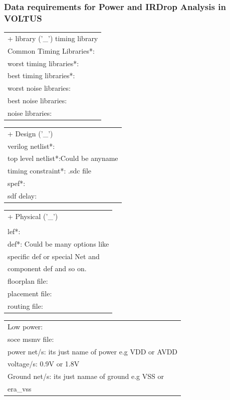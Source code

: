\documentclass[a4paper]{article}
\begin{document}
\subsubsection{Data requirements for Power and IRDrop Analysis in VOLTUS}
\label{sec:org538b9f6}

\begin{center}
\begin{tabular}{l}
+ library ('\_') timing library\\
Common Timing Libraries*:\\
worst timing libraries*:\\
best timing libraries*:\\
worst noise libraries:\\
best noise libraries:\\
noise libraries:\\
\end{tabular}
\end{center}



\begin{center}
\begin{tabular}{l}
+ Design ('\_')\\
verilog netlist*:\\
top level netlist*:Could be anyname\\
timing constraint*:   .sdc file\\
spef*:\\
sdf delay:\\
\end{tabular}
\end{center}




\begin{center}
\begin{tabular}{l}
+ Physical ('\_')\\
\\
lef*:\\
def*: Could be many options like\\
specific def or special Net and\\
component def and so on.\\
floorplan file:\\
placement file:\\
routing file:\\
\end{tabular}
\end{center}


\begin{center}
\begin{tabular}{l}
Low power:\\
soce msmv file:\\
power net/s: its just name of power e.g VDD or AVDD\\
voltage/s: 0.9V or 1.8V\\
Ground net/s: its just namae of ground e.g VSS or\\
era\_vss\\
\end{tabular}
\end{center}
\end{document}
